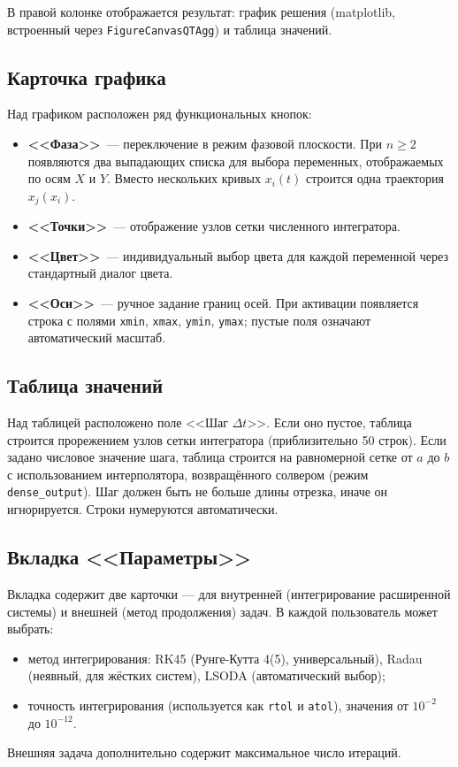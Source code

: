 \documentclass[12pt]{article}
\begin{document}
В правой колонке отображается результат: график решения (matplotlib, встроенный через \texttt{FigureCanvasQTAgg}) и таблица значений.

\subsection{Карточка графика}

Над графиком расположен ряд функциональных кнопок:
\begin{itemize}
  \item \textbf{<<Фаза>>}~--- переключение в режим фазовой плоскости. При $n \geq 2$ появляются два выпадающих списка для выбора переменных, отображаемых по осям $X$ и $Y$. Вместо нескольких кривых $x_i(t)$ строится одна траектория $x_j(x_i)$.
  \item \textbf{<<Точки>>}~--- отображение узлов сетки численного интегратора.
  \item \textbf{<<Цвет>>}~--- индивидуальный выбор цвета для каждой переменной через стандартный диалог цвета.
  \item \textbf{<<Оси>>}~--- ручное задание границ осей. При активации появляется строка с полями \texttt{xmin}, \texttt{xmax}, \texttt{ymin}, \texttt{ymax}; пустые поля означают автоматический масштаб.
\end{itemize}

\subsection{Таблица значений}

Над таблицей расположено поле <<Шаг $\Delta t$>>. Если оно пустое, таблица строится прорежением узлов сетки интегратора (приблизительно 50 строк). Если задано числовое значение шага, таблица строится на равномерной сетке от $a$ до $b$ с использованием интерполятора, возвращённого солвером (режим \texttt{dense\_output}). Шаг должен быть не больше длины отрезка, иначе он игнорируется. Строки нумеруются автоматически.

\subsection{Вкладка <<Параметры>>}

Вкладка содержит две карточки --- для внутренней (интегрирование расширенной системы) и внешней (метод продолжения) задач. В каждой пользователь может выбрать:
\begin{itemize}
  \item метод интегрирования: RK45 (Рунге-Кутта 4(5), универсальный), Radau (неявный, для жёстких систем), LSODA (автоматический выбор);
  \item точность интегрирования (используется как \texttt{rtol} и \texttt{atol}), значения от $10^{-2}$ до $10^{-12}$.
\end{itemize}
Внешняя задача дополнительно содержит максимальное число итераций.
\end{document}
